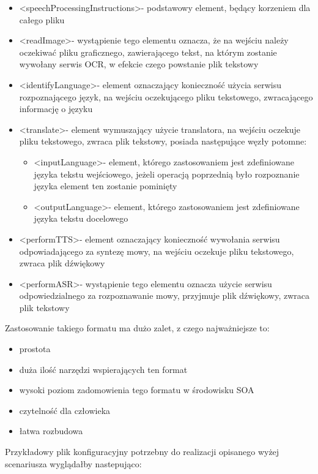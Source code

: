  \begin{itemize}
	\item \textless speechProcessingInstructions\textgreater - podstawowy element, będący korzeniem dla całego pliku
	\item \textless readImage\textgreater - wystąpienie tego elementu oznacza, że na wejściu należy oczekiwać pliku graficznego, zawierającego tekst, na którym zostanie wywołany serwis OCR, w efekcie czego powstanie plik tekstowy
	\item \textless identifyLanguage\textgreater - element oznaczający konieczność użycia serwisu rozpoznającego język, na wejściu oczekującego pliku tekstowego, zwracającego informację o języku
	\item \textless translate\textgreater - element wymuszający użycie translatora, na wejściu oczekuje pliku tekstowego, zwraca plik tekstowy, posiada następujące węzły potomne:
		 \begin{itemize}
			\item \textless inputLanguage\textgreater - element, którego zastosowaniem jest zdefiniowane języka tekstu wejściowego, jeżeli operacją poprzednią  było rozpoznanie języka element ten zostanie pominięty
			\item \textless outputLanguage\textgreater - element, którego zastosowaniem jest zdefiniowane języka tekstu docelowego
		\end{itemize}
	\item \textless performTTS\textgreater - element oznaczający konieczność wywołania serwisu odpowiadającego za syntezę mowy, na wejściu oczekuje pliku tekstowego, zwraca plik dźwiękowy
	\item \textless performASR\textgreater - wystąpienie tego elementu oznacza użycie serwisu odpowiedzialnego  za rozpoznawanie mowy, przyjmuje plik dźwiękowy, zwraca plik tekstowy
\end{itemize}
Zastosowanie takiego formatu ma dużo zalet, z czego najważniejsze to:
\begin{itemize}
	\item prostota
	\item duża ilość narzędzi wspierających ten format
	\item wysoki poziom zadomowienia tego formatu w środowisku SOA
	\item czytelność dla człowieka
	\item łatwa rozbudowa
\end{itemize}
\newpage
Przykładowy plik konfiguracyjny potrzebny do realizacji opisanego wyżej scenariusza wyglądałby nastepująco:

